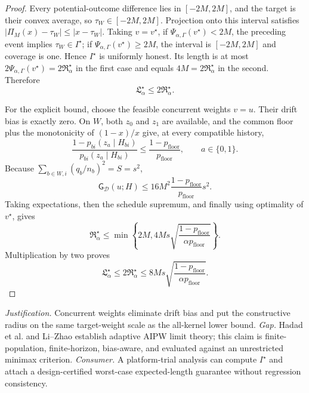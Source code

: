 \documentclass{article}
\begin{document}
\begin{proof}
Every potential-outcome difference lies in \([-2M,2M]\), and the target is their convex average, so \(\tau_W\in[-2M,2M]\).  Projection onto this interval satisfies \(|\Pi_M(x)-\tau_W|\le|x-\tau_W|\).  Taking \(v=v^\star\), if \(\Psi_{\alpha,\Gamma}(v^\star)<2M\), the preceding event implies \(\tau_W\in I^\star\); if \(\Psi_{\alpha,\Gamma}(v^\star)\ge2M\), the interval is \([-2M,2M]\) and coverage is one.  Hence \(I^\star\) is uniformly honest.  Its length is at most \(2\Psi_{\alpha,\Gamma}(v^\star)=2\mathfrak R_\alpha^\star\) in the first case and equals \(4M=2\mathfrak R_\alpha^\star\) in the second.  Therefore
\[
 \mathfrak L_\alpha^\star\le2\mathfrak R_\alpha^\star.
\]

For the explicit bound, choose the feasible concurrent weights \(v=u\).  Their drift bias is exactly zero.  On \(W\), both \(z_0\) and \(z_1\) are available, and the common floor plus the monotonicity of \((1-x)/x\) give, at every compatible history,
\[
 \frac{1-p_{bi}(z_a\mid H_{bi})}{p_{bi}(z_a\mid H_{bi})}
 \le\frac{1-p_{\mathrm{floor}}}{p_{\mathrm{floor}}},
 \qquad a\in\{0,1\}.
\]
Because \(\sum_{b\in W,i}(q_b/n_b)^2=S=s^2\),
\[
 \mathsf G_{\mathcal D}(u;H)
 \le16M^2\frac{1-p_{\mathrm{floor}}}{p_{\mathrm{floor}}}s^2.
\]
Taking expectations, then the schedule supremum, and finally using optimality of \(v^\star\), gives
\[
 \mathfrak R_\alpha^\star
 \le \min\left\{2M,
 4Ms\sqrt{\frac{1-p_{\mathrm{floor}}}{\alpha p_{\mathrm{floor}}}}\right\}.
\]
Multiplication by two proves
\[
 \mathfrak L_\alpha^\star\le2\mathfrak R_\alpha^\star
 \le8Ms\sqrt{\frac{1-p_{\mathrm{floor}}}{\alpha p_{\mathrm{floor}}}}.
\]
\end{proof}
\par\smallskip\noindent \textit{Justification.} Concurrent weights eliminate drift bias and put the constructive radius on the same target-weight scale as the all-kernel lower bound. \textit{Gap.} Hadad et al. and Li--Zhao establish adaptive AIPW limit theory; this claim is finite-population, finite-horizon, bias-aware, and evaluated against an unrestricted minimax criterion. \textit{Consumer.} A platform-trial analysis can compute \(I^\star\) and attach a design-certified worst-case expected-length guarantee without regression consistency.
\end{document}
